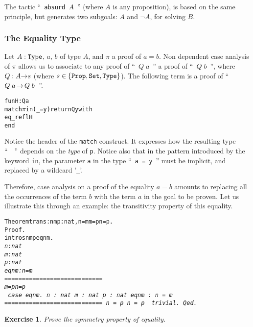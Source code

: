 \documentclass[11pt]{article}
\newtheorem{exercise}{Exercise}[section]
\begin{document}
The tactic ``~\texttt{absurd $A$}~'' (where $A$ is any proposition), 
is based on the same principle, but
generates two subgoals: $A$ and $\neg A$, for solving $B$.

\subsubsection{The Equality Type}

Let $A:\texttt{Type}$, $a$, $b$ of type $A$, and $\pi$ a proof of 
$a=b$. Non dependent case analysis of $\pi$ allows us to
associate to any proof  of ``~$Q\;a$~'' a proof of ``~$Q\;b$~'',
where $Q:A\mbox{$\rightarrow$}{} s$ (where $s\in\{\texttt{Prop}, \texttt{Set}, \texttt{Type}\}$).
The following term is a proof  of ``~$Q\;a\, \mbox{$\rightarrow$}{}\, Q\;b$~''.

\begin{alltt}
fun H : Q a {\funarrow}
  match \(\pi\) in (_ = y) return Q y with
     eq_refl {\funarrow} H
  end
\end{alltt}
Notice the header of the \texttt{match} construct.
It expresses how the resulting type ``~~'' depends on 
the \emph{type} of \texttt{p}.
Notice also that in the pattern introduced by the keyword \texttt{in},
the parameter \texttt{a} in the type ``~\texttt{a = y}~'' must be
implicit, and replaced by a wildcard '\texttt{\_}'.


Therefore, case analysis on a proof of the equality $a=b$
amounts to replacing all the occurrences of the term $b$ with the term
$a$ in the goal to be proven. Let us illustrate this through an
example: the transitivity property of this equality. 
\begin{alltt}
Theorem trans : {\prodsym} n m p:nat, n=m \arrow{} m=p \arrow{} n=p.
Proof.
 intros n m p eqnm.  
\it{}  
  n : nat
  m : nat
  p : nat
  eqnm : n = m
  ============================
   m = p {\arrow} n = p
\tt{} case eqnm.
\it{}
  n : nat
  m : nat
  p : nat
  eqnm : n = m
  ============================
   n = p {\arrow} n = p
\tt{} trivial.
Qed.
\end{alltt}


\begin{exercise}
Prove the symmetry property of  equality.
\end{exercise}
\end{document}
